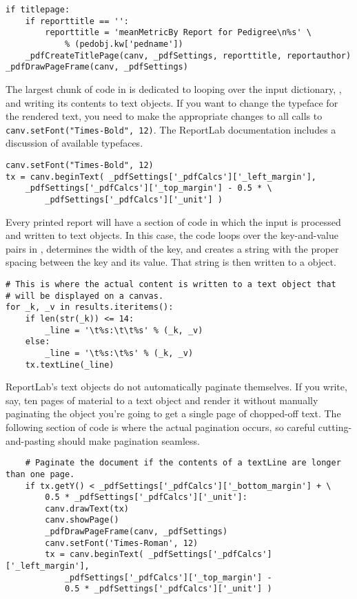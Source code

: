 \begin{verbatim}
if titlepage:
    if reporttitle == '':
        reporttitle = 'meanMetricBy Report for Pedigree\n%s' \
            % (pedobj.kw['pedname'])
    _pdfCreateTitlePage(canv, _pdfSettings, reporttitle, reportauthor)
_pdfDrawPageFrame(canv, _pdfSettings)
\end{verbatim}
The largest chunk of code in  is dedicated to looping over the input dictionary, , and writing its contents to text objects.  If you want to change the typeface for the rendered text, you need to make the appropriate changes to all calls to \texttt{canv.setFont("Times-Bold", 12)}.  The ReportLab documentation includes a discussion of available typefaces.
\begin{verbatim}
canv.setFont("Times-Bold", 12)
tx = canv.beginText( _pdfSettings['_pdfCalcs']['_left_margin'],
    _pdfSettings['_pdfCalcs']['_top_margin'] - 0.5 * \
        _pdfSettings['_pdfCalcs']['_unit'] )
\end{verbatim}
Every printed report will have a section of code in which the input is processed and written to text objects. In this case, the code loops over the key-and-value pairs in , determines the width of the key, and creates a string with the proper spacing between the key and its value.  That string is then written to a  object.
\begin{verbatim}
# This is where the actual content is written to a text object that
# will be displayed on a canvas.
for _k, _v in results.iteritems():
    if len(str(_k)) <= 14:
        _line = '\t%s:\t\t%s' % (_k, _v)
    else:
        _line = '\t%s:\t%s' % (_k, _v)
    tx.textLine(_line)
\end{verbatim}
ReportLab's text objects do not automatically paginate themselves.  If you write, say, ten pages of material to a text object and render it without manually paginating the object you're going to get a single page of chopped-off text.  The following section of code is where the actual pagination occurs, so careful cutting-and-pasting should make pagination seamless.
\begin{verbatim}
    # Paginate the document if the contents of a textLine are longer than one page.
    if tx.getY() < _pdfSettings['_pdfCalcs']['_bottom_margin'] + \
        0.5 * _pdfSettings['_pdfCalcs']['_unit']:
        canv.drawText(tx)
        canv.showPage()
        _pdfDrawPageFrame(canv, _pdfSettings)
        canv.setFont('Times-Roman', 12)
        tx = canv.beginText( _pdfSettings['_pdfCalcs']['_left_margin'],
            _pdfSettings['_pdfCalcs']['_top_margin'] -
            0.5 * _pdfSettings['_pdfCalcs']['_unit'] )
\end{verbatim}
